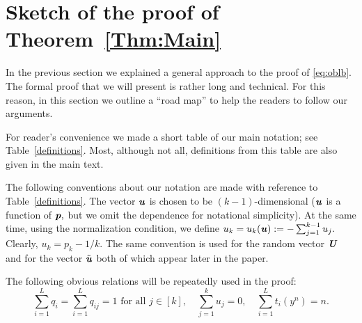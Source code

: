 \documentclass[11pt,onecolumn]{IEEEtran}
\def\mathbi#1{{\textbf{\textit #1}}}
\begin{document}
\section{Sketch of the proof of Theorem~\ref{Thm:Main}}\label{Sect:sketch}
In the previous section we explained a general approach to the proof of   \eqref{eq:oblb}. The formal
proof that we will present is rather long and technical. For this reason, in this section we outline a ``road map'' to help the 
readers to follow our arguments. 

For reader's convenience we made a short table of our main notation;  see Table~\ref{definitions}.
Most, although not all, definitions from this table are also given in the main text.

The following conventions about our notation are made with reference to Table~\ref{definitions}. The vector $\mathbi{u}$ is chosen to be $(k-1)$-dimensional ($\mathbi{u}$ is a function of $\mathbi{p},$ but we omit the dependence for notational simplicity). At the same time, using the normalization condition, we
define  $u_k=u_k(\mathbi{u}):=-\sum_{j=1}^{k-1} u_j.$
Clearly, $u_k=p_k-1/k.$ The same convention is used for the random vector $\mathbi{U}$ and for the vector 
$\tilde{\mathbi{u}}$ both of which appear later in the paper.

The following obvious relations will be repeatedly used in the proof:
  \begin{equation}\label{eq:qu}
  \sum_{i=1}^L q_i = \sum_{i=1}^Lq_{ij}=1 \text{ for all }j\in[k], \quad \sum_{j=1}^k u_j=0, \quad \sum_{i=1}^L t_i(y^n)=n.
  \end{equation}
\end{document}
